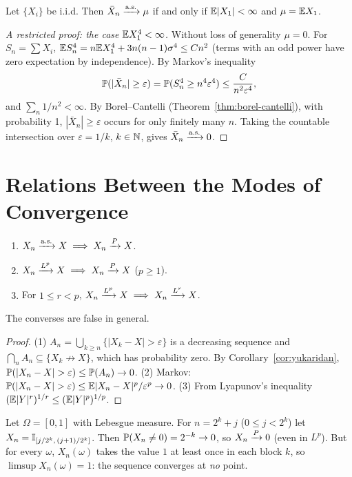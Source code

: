 \documentclass[main.tex]{subfiles}
\begin{document}
\begin{theorem}\label{thm:slln}
Let $\{X_i\}$ be i.i.d. Then $\bar X_n\asto\mu$ if and only if $\E|X_1|<\infty$ and $\mu=\E X_1$.
\end{theorem}

\begin{proof}[A restricted proof: the case $\E X_1^4<\infty$]
Without loss of generality $\mu=0$. For $S_n=\sum X_i$, $\E S_n^4=n\E X_1^4+3n(n-1)\sigma^4\le Cn^2$ (terms with an odd power have zero expectation by independence). By Markov's inequality
\[
\P(|\bar X_n|\ge\varepsilon)=\P(S_n^4\ge n^4\varepsilon^4)\le\frac{C}{n^2\varepsilon^4},
\]
and $\sum_n 1/n^2<\infty$. By Borel--Cantelli (Theorem~\ref{thm:borel-cantelli}), with probability 1, $|\bar X_n|\ge\varepsilon$ occurs for only finitely many $n$. Taking the countable intersection over $\varepsilon=1/k$, $k\in\N$, gives $\bar X_n\asto0$.
\end{proof}

\section{Relations Between the Modes of Convergence}

\begin{theorem}\label{thm:hiyerarsi}
\begin{enumerate}
  \item $X_n\asto X\implies X_n\pto X$.
  \item $X_n\Lto{p} X\implies X_n\pto X$ ($p\ge1$).
  \item For $1\le r<p$, $X_n\Lto{p} X\implies X_n\Lto{r} X$.
\end{enumerate}
The converses are false in general.
\end{theorem}
\begin{proof}
(1) $A_n=\bigcup_{k\ge n}\{|X_k-X|>\varepsilon\}$ is a decreasing sequence and $\bigcap_n A_n\subseteq\{X_k\not\to X\}$, which has probability zero. By Corollary~\ref{cor:yukaridan}, $\P(|X_n-X|>\varepsilon)\le\P(A_n)\to0$.
(2) Markov: $\P(|X_n-X|>\varepsilon)\le\E|X_n-X|^p/\varepsilon^p\to0$.
(3) From Lyapunov's inequality $(\E|Y|^r)^{1/r}\le(\E|Y|^p)^{1/p}$.
\end{proof}

\begin{example}\label{ex:daktilo}
Let $\Omega=[0,1]$ with Lebesgue measure. For $n=2^k+j$ ($0\le j<2^k$) let $X_n=\I_{[j/2^k,\,(j+1)/2^k]}$. Then $\P(X_n\neq0)=2^{-k}\to0$, so $X_n\pto0$ (even in $L^p$). But for every $\omega$, $X_n(\omega)$ takes the value $1$ at least once in each block $k$, so $\limsup X_n(\omega)=1$: the sequence converges at \emph{no} point.
\end{example}
\end{document}
